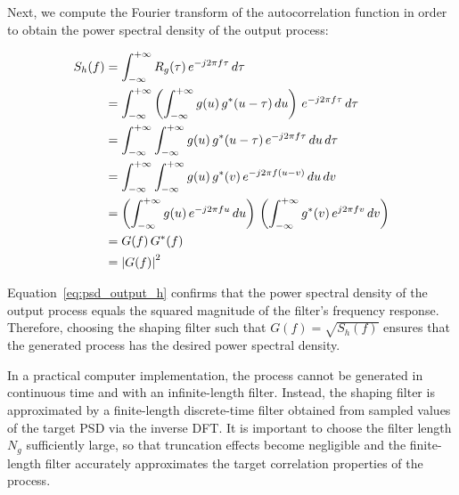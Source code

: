 Next, we compute the Fourier transform of the autocorrelation function in order to obtain the power spectral density of the output process:
\begin{fleqn}[0.75cm]
\begin{align}
    S_h(f) 
    &= \int_{-\infty}^{+\infty} R_g(\tau) \, e^{-j 2 \pi f \tau} \, d\tau \notag \\
    &= \int_{-\infty}^{+\infty} \left( \int_{-\infty}^{+\infty} g(u) \, g^*(u-\tau) \, du \right) \, e^{-j 2 \pi f \tau} \, d\tau \notag \\
    &= \int_{-\infty}^{+\infty} \int_{-\infty}^{+\infty} g(u) \, g^*(u-\tau) \, e^{-j 2 \pi f \tau} \, du \, d\tau \notag \\
    &= \int_{-\infty}^{+\infty} \int_{-\infty}^{+\infty} g(u) \, g^*(v) \, e^{-j 2 \pi f (u-v)} \, du \, dv \notag \\
    &= \left( \int_{-\infty}^{+\infty} g(u) \, e^{-j 2 \pi f u} \, du \right) \, \left( \int_{-\infty}^{+\infty} g^*(v) \, e^{j 2 \pi f v} \, dv \right) \notag \\
    &= G(f) \, G^*(f) \notag \\
    &= \left|G(f)\right|^2 \label{eq:psd_output_h}
\end{align}
\end{fleqn}

Equation~\eqref{eq:psd_output_h} confirms that the power spectral density of the output process equals the squared magnitude of the filter's frequency response.
Therefore, choosing the shaping filter such that $G(f) = \sqrt{S_h(f)}$ ensures that the generated process has the desired power spectral density.

In a practical computer implementation, the process cannot be generated in continuous time and with an infinite-length filter.
Instead, the shaping filter is approximated by a finite-length discrete-time filter obtained from sampled values of the target \ac{PSD} via the inverse \ac{DFT}.
It is important to choose the filter length $N_g$ sufficiently large, so that truncation effects become negligible and the finite-length filter accurately approximates the target correlation properties of the process.
